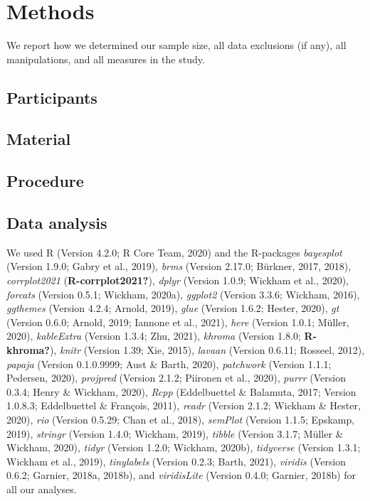 \documentclass[
  man]{apa6}
\begin{document}
\hypertarget{methods}{%
\section{Methods}\label{methods}}

We report how we determined our sample size, all data exclusions (if any), all manipulations, and all measures in the study.

\hypertarget{participants}{%
\subsection{Participants}\label{participants}}

\hypertarget{material}{%
\subsection{Material}\label{material}}

\hypertarget{procedure}{%
\subsection{Procedure}\label{procedure}}

\hypertarget{data-analysis}{%
\subsection{Data analysis}\label{data-analysis}}

We used R (Version 4.2.0; R Core Team, 2020) and the R-packages \emph{bayesplot} (Version 1.9.0; Gabry et al., 2019), \emph{brms} (Version 2.17.0; Bürkner, 2017, 2018), \emph{corrplot2021} (\textbf{R-corrplot2021?}), \emph{dplyr} (Version 1.0.9; Wickham et al., 2020), \emph{forcats} (Version 0.5.1; Wickham, 2020a), \emph{ggplot2} (Version 3.3.6; Wickham, 2016), \emph{ggthemes} (Version 4.2.4; Arnold, 2019), \emph{glue} (Version 1.6.2; Hester, 2020), \emph{gt} (Version 0.6.0; Arnold, 2019; Iannone et al., 2021), \emph{here} (Version 1.0.1; Müller, 2020), \emph{kableExtra} (Version 1.3.4; Zhu, 2021), \emph{khroma} (Version 1.8.0; \textbf{R-khroma?}), \emph{knitr} (Version 1.39; Xie, 2015), \emph{lavaan} (Version 0.6.11; Rosseel, 2012), \emph{papaja} (Version 0.1.0.9999; Aust \& Barth, 2020), \emph{patchwork} (Version 1.1.1; Pedersen, 2020), \emph{projpred} (Version 2.1.2; Piironen et al., 2020), \emph{purrr} (Version 0.3.4; Henry \& Wickham, 2020), \emph{Rcpp} (Eddelbuettel \& Balamuta, 2017; Version 1.0.8.3; Eddelbuettel \& François, 2011), \emph{readr} (Version 2.1.2; Wickham \& Hester, 2020), \emph{rio} (Version 0.5.29; Chan et al., 2018), \emph{semPlot} (Version 1.1.5; Epskamp, 2019), \emph{stringr} (Version 1.4.0; Wickham, 2019), \emph{tibble} (Version 3.1.7; Müller \& Wickham, 2020), \emph{tidyr} (Version 1.2.0; Wickham, 2020b), \emph{tidyverse} (Version 1.3.1; Wickham et al., 2019), \emph{tinylabels} (Version 0.2.3; Barth, 2021), \emph{viridis} (Version 0.6.2; Garnier, 2018a, 2018b), and \emph{viridisLite} (Version 0.4.0; Garnier, 2018b) for all our analyses.
\end{document}

